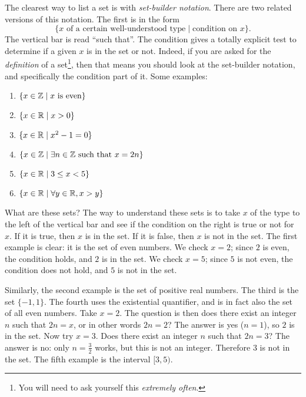 \documentclass{tufte-book}
\begin{document}
The clearest way to list a set is with \emph{set-builder notation}. There are two related versions of this notation. The first is in the form
\[
\{ x \text{ of a certain well-understood type} \mid \text{condition on } x\}.
\]
The vertical bar is read ``such that''. The condition gives a totally explicit test to determine if a given $x$ is in the set or not. Indeed, if you are asked for the \emph{definition} of a set\footnote{You will need to ask yourself this \emph{extremely often}.}, then that means you should look at the set-builder notation, and specifically the condition part of it. Some examples:
\begin{enumerate}
    \item $\{x \in \mathbb{Z} \mid x \text{ is even}\}$
    \item $\{x \in \mathbb{R} \mid x > 0 \}$
    \item $\{x \in \mathbb{R} \mid x^2 - 1 = 0\}$
    \item $\{x \in \mathbb{Z} \mid \exists n \in \mathbb{Z} \text{ such that } x = 2n\}$
    \item $\{x \in \mathbb{R} \mid 3 \leq x < 5\}$
    \item $\{x \in \mathbb{R} \mid \forall y \in \mathbb{R}, x > y\}$
\end{enumerate}
What are these sets? The way to understand these sets is to take $x$ of the type to the left of the vertical bar and see if the condition on the right is true or not for $x$. If it is true, then $x$ is in the set. If it is false, then $x$ is not in the set. The first example is clear: it is the set of even numbers. We check $x = 2$; since $2$ is even, the condition holds, and $2$ is in the set. We check $x = 5$; since $5$ is not even, the condition does not hold, and $5$ is not in the set.

Similarly, the second example is the set of positive real numbers. The third is the set $\{-1, 1\}$. The fourth uses the existential quantifier, and is in fact also the set of all even numbers. Take $x = 2$. The question is then does there exist an integer $n$ such that $2n = x$, or in other words $2n = 2$? The answer is yes ($n = 1$), so $2$ is in the set. Now try $x = 3$. Does there exist an integer $n$ such that $2n = 3$? The answer is no: only $n = \frac32$ works, but this is not an integer. Therefore $3$ is not in the set. The fifth example is the interval $[3,5)$.
\end{document}
